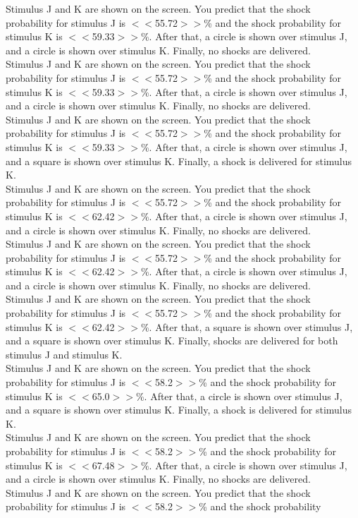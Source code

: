 \documentclass[pdflatex,sn-nature]{sn-jnl}%
\theoremstyle{thmstyleone}%
\theoremstyle{thmstyletwo}%
\theoremstyle{thmstylethree}%
\begin{document}
Stimulus J and K are shown on the screen. You predict that the shock probability for stimulus J is $<<$55.72$>>$\% and the shock probability for stimulus K is $<<$59.33$>>$\%. After that, a circle is shown over stimulus J, and a circle is shown over stimulus K. Finally, no shocks are delivered. $~$\\ 
Stimulus J and K are shown on the screen. You predict that the shock probability for stimulus J is $<<$55.72$>>$\% and the shock probability for stimulus K is $<<$59.33$>>$\%. After that, a circle is shown over stimulus J, and a circle is shown over stimulus K. Finally, no shocks are delivered. $~$\\ 
Stimulus J and K are shown on the screen. You predict that the shock probability for stimulus J is $<<$55.72$>>$\% and the shock probability for stimulus K is $<<$59.33$>>$\%. After that, a circle is shown over stimulus J, and a square is shown over stimulus K. Finally, a shock is delivered for stimulus K. $~$\\ 
Stimulus J and K are shown on the screen. You predict that the shock probability for stimulus J is $<<$55.72$>>$\% and the shock probability for stimulus K is $<<$62.42$>>$\%. After that, a circle is shown over stimulus J, and a circle is shown over stimulus K. Finally, no shocks are delivered. $~$\\ 
Stimulus J and K are shown on the screen. You predict that the shock probability for stimulus J is $<<$55.72$>>$\% and the shock probability for stimulus K is $<<$62.42$>>$\%. After that, a circle is shown over stimulus J, and a circle is shown over stimulus K. Finally, no shocks are delivered. $~$\\ 
Stimulus J and K are shown on the screen. You predict that the shock probability for stimulus J is $<<$55.72$>>$\% and the shock probability for stimulus K is $<<$62.42$>>$\%. After that, a square is shown over stimulus J, and a square is shown over stimulus K. Finally, shocks are delivered for both stimulus J and stimulus K. $~$\\ 
Stimulus J and K are shown on the screen. You predict that the shock probability for stimulus J is $<<$58.2$>>$\% and the shock probability for stimulus K is $<<$65.0$>>$\%. After that, a circle is shown over stimulus J, and a square is shown over stimulus K. Finally, a shock is delivered for stimulus K. $~$\\ 
Stimulus J and K are shown on the screen. You predict that the shock probability for stimulus J is $<<$58.2$>>$\% and the shock probability for stimulus K is $<<$67.48$>>$\%. After that, a circle is shown over stimulus J, and a circle is shown over stimulus K. Finally, no shocks are delivered. $~$\\ 
Stimulus J and K are shown on the screen. You predict that the shock probability for stimulus J is $<<$58.2$>>$\% and the shock probability  
\end{document}
